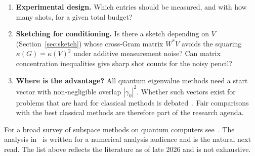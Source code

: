 \documentclass[11pt,a4paper]{article}
\begin{document}
\begin{enumerate}
\item \textbf{Experimental design.} Which entries should be measured,
  and with how many shots, for a given total budget?
\item \textbf{Sketching for conditioning.} Is there a sketch depending on
  $V$ (Section~\ref{sec:sketch}) whose cross-Gram matrix $W^*V$ avoids the
  squaring $\kappa(G)=\kappa(V)^2$ under additive measurement noise? Can
  matrix concentration inequalities give sharp shot counts for the noisy
  pencil?
\item \textbf{Where is the advantage?} All quantum eigenvalue methods
  need a start vector with non-negligible overlap $|\gamma_0|^2$. Whether such
  vectors exist for problems that are hard for classical methods is
  debated~\cite{Lee23}. Fair comparisons with the best classical methods
  are therefore part of the research agenda.
\end{enumerate}

For a broad survey of subspace methods on quantum computers
see~\cite{Motta24}. The analysis in~\cite{ELN22} is written for a
numerical analysis audience and is the natural next read. The list above
reflects the literature as of late 2026 and is not exhaustive.
\end{document}
